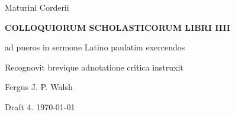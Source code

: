 \documentclass{article}
\begin{document}
\thispagestyle{empty}
\setlength{\parindent}{0em}
\begin{center}
{\huge Maturini Corderii}

\vspace{2em}

{\huge \textbf{COLLOQUIORUM SCHOLASTICORUM LIBRI IIII}}

\vspace{2em}

{\huge ad pueros in sermone Latino paulatim exercendos}


\vfill

{\huge Recognovit brevique adnotatione critica instruxit}

\vspace{2em}

{\huge Fergus J. P. Walsh}
\end{center}

\vspace{2em}

{\begin{english}\huge Draft 4. \today\end{english}}
\end{document}
